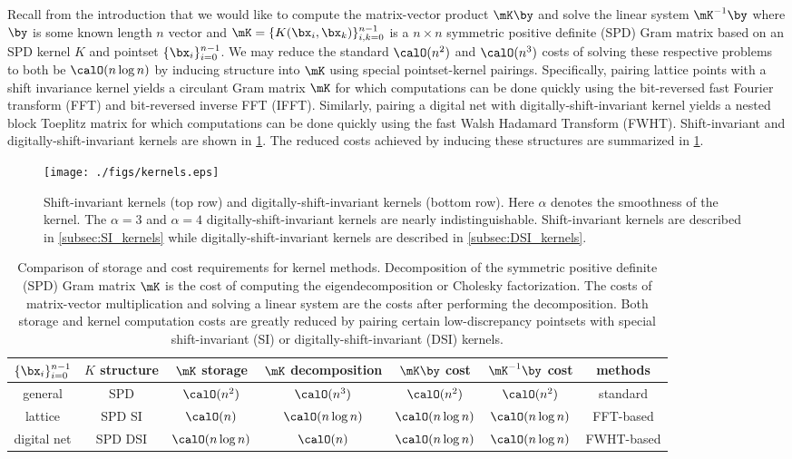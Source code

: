 \documentclass[acmsmall]{acmart}
\begin{document}
Recall from the introduction that we would like to compute the matrix-vector product $\mK \by$ and solve the linear system $\mK^{-1} \by$ where $\by$ is some known length $n$ vector and $\mK = \{K(\bx_i,\bx_k)\}_{i,k=0}^{n-1}$ is a $n \times n$ symmetric positive definite (SPD) Gram matrix based on an SPD kernel $K$ and pointset $\{\bx_i\}_{i=0}^{n-1}$. We may reduce the standard $\calO(n^2)$ and $\calO(n^3)$ costs of solving these respective problems to both be $\calO(n \log n)$ by inducing structure into $\mK$ using special pointset-kernel pairings. Specifically, pairing lattice points with a shift invariance kernel yields a circulant Gram matrix $\mK$ for which computations can be done quickly using the bit-reversed fast Fourier transform (FFT) and bit-reversed inverse FFT (IFFT). Similarly, pairing a digital net with digitally-shift-invariant kernel yields a nested block Toeplitz matrix for which computations can be done quickly using the fast Walsh Hadamard Transform (FWHT). Shift-invariant and digitally-shift-invariant kernels are shown in \cref{fig:SI_DSI_kernels}. The reduced costs achieved by inducing these structures are summarized in \cref{tab:com_kernel_costs}.

\begin{figure}%
    \centering
    \texttt{[image: ./figs/kernels.eps]}
    \caption{Shift-invariant kernels (top row) and digitally-shift-invariant kernels (bottom row). Here $\alpha$ denotes the smoothness of the kernel. The $\alpha=3$ and $\alpha=4$ digitally-shift-invariant kernels are nearly indistinguishable. Shift-invariant kernels are described in \cref{subsec:SI_kernels} while digitally-shift-invariant kernels are described in \cref{subsec:DSI_kernels}.}
    \Description[]{}
    \label{fig:SI_DSI_kernels}
\end{figure}

\begin{table}[H]
    \centering
    \begin{tabular}{ccccccc} 
        $\{\bx_i\}_{i=0}^{n-1}$ & $K$ structure & $\mK$ storage & $\mK$ decomposition & $\mK \by$ cost & $\mK^{-1} \by$ cost & methods \\ 
        \hline 
        general & SPD & $\calO(n^2)$ & $\calO(n^3)$ & $\calO(n^2)$ & $\calO(n^2)$ & standard  \\
        lattice & SPD SI & $\calO(n)$ & $\calO(n \log n)$ & $\calO(n \log n)$ & $\calO(n \log n)$ & FFT-based \\ 
        digital net & SPD DSI & $\calO(n \log n)$ & $\calO(n)$ & $\calO(n \log n)$ & $\calO(n \log n)$ &FWHT-based
    \end{tabular}
    \caption{Comparison of storage and cost requirements for kernel methods. Decomposition of the symmetric positive definite (SPD) Gram matrix $\mK$ is the cost of computing the eigendecomposition or Cholesky factorization. The costs of matrix-vector multiplication and solving a linear system are the costs after performing the decomposition. Both storage and kernel computation costs are greatly reduced by pairing certain low-discrepancy pointsets with special shift-invariant (SI) or digitally-shift-invariant (DSI) kernels.}
    \label{tab:com_kernel_costs}
\end{table}
\end{document}
